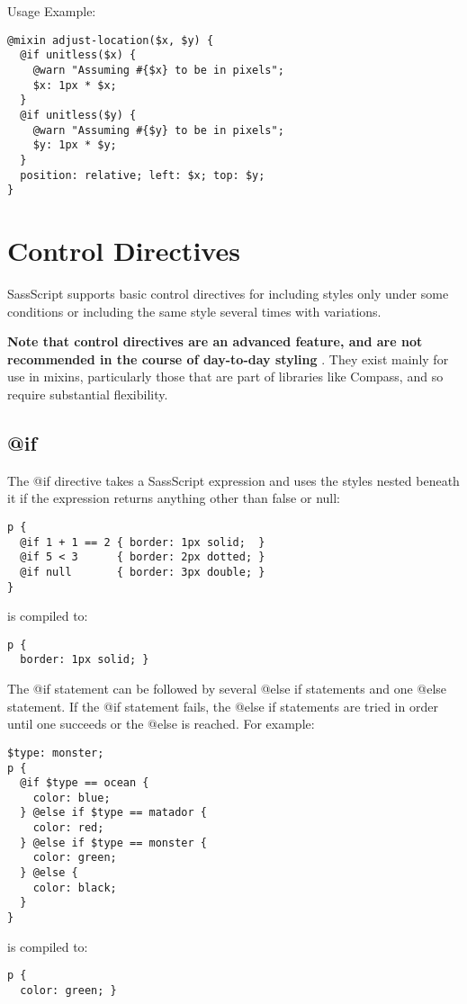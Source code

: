 \documentclass[9pt]{article}
\begin{document}
 Usage Example:
\begin{verbatim}
@mixin adjust-location($x, $y) {
  @if unitless($x) {
    @warn "Assuming #{$x} to be in pixels";
    $x: 1px * $x;
  }
  @if unitless($y) {
    @warn "Assuming #{$y} to be in pixels";
    $y: 1px * $y;
  }
  position: relative; left: $x; top: $y;
}
\end{verbatim}
\section{Control Directives}


 SassScript supports basic control directives for including styles only under some conditions or including the same style several times with variations.


 \textbf{Note that control directives are an advanced feature, and are not recommended in the course of day-to-day styling}
. They exist mainly for use in mixins, particularly those that are part of libraries like Compass, and so require substantial flexibility.
\subsection{@if}


 The @if directive takes a SassScript expression and uses the styles nested beneath it if the expression returns anything other than false or null:
\begin{verbatim}
p {
  @if 1 + 1 == 2 { border: 1px solid;  }
  @if 5 < 3      { border: 2px dotted; }
  @if null       { border: 3px double; }
}
\end{verbatim}


 is compiled to:
\begin{verbatim}
p {
  border: 1px solid; }
\end{verbatim}


 The @if statement can be followed by several @else if statements and one @else statement. If the @if statement fails, the @else if statements are tried in order until one succeeds or the @else is reached. For example:
\begin{verbatim}
$type: monster;
p {
  @if $type == ocean {
    color: blue;
  } @else if $type == matador {
    color: red;
  } @else if $type == monster {
    color: green;
  } @else {
    color: black;
  }
}
\end{verbatim}


 is compiled to:
\begin{verbatim}
p {
  color: green; }
\end{verbatim}
\end{document}

